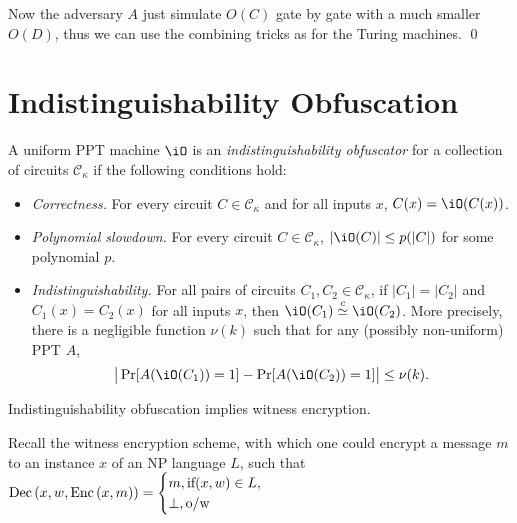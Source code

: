 Now the adversary $A$ just simulate $O(C)$ gate by gate with a much smaller $O(D)$, thus we can use the combining tricks as for the Turing machines.
\qed

\section{Indistinguishability Obfuscation}



\newcommand{\Ck}{\ensuremath{\mathcal{C}_\kappa}}

\begin{definition}
A uniform PPT machine $\iO$ is an \emph{indistinguishability obfuscator}
for a collection of circuits $\Ck$ if the following conditions hold:
\begin{itemize}

\item \emph{Correctness.}
For every circuit $C \in \Ck$ and for all inputs $x$,
$C(x) = \iO(C(x))$.

\item \emph{Polynomial slowdown.}
For every circuit $C \in \Ck$, $|\iO(C)| \leq p(|C|)$ for some
polynomial $p$.

\item \emph{Indistinguishability.}
For all pairs of circuits $C_1, C_2 \in \Ck$, if $|C_1| = |C_2|$ and
$C_1(x) = C_2(x)$ for all inputs $x$, then
$\iO(C_1) \overset{c}{\simeq} \iO(C_2)$.
More precisely, there is a negligible function $\nu(k)$ such that for
any (possibly non-uniform) PPT $A$,
\begin{equation*}
\big| \Pr[A(\iO(C_1)) = 1] - \Pr[A(\iO(C_2)) = 1] \big| \leq \nu(k).
\end{equation*}

\end{itemize}
\end{definition}


\begin{lemma}
	Indistinguishability obfuscation implies witness encryption.
\end{lemma}
\proof
Recall the witness encryption scheme, with which one could encrypt a message $m$ to an instance $x$ of an NP language $L$, such that $\mathop{\mathrm{Dec}}\left(x,w,\mathop{\mathrm{Enc}}\left(x,m\right)\right)=
\begin{cases}
	m, \hbox{if} (x,w)\in L, \\
	\bot, \hbox{o/w}
\end{cases}$

